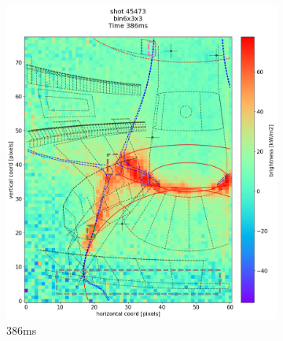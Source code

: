 \begin{figure}
     \centering
     \begin{subfigure}{0.355\linewidth}
         \centering
         \includegraphics[trim={50 0 25 80},clip,width=\textwidth]{Chapters/chapter2/figs/IRVB-MASTU_shot-45473_export_34.png}
         \caption{386ms}
         \label{fig:45473_export_1}
     \end{subfigure}
     \begin{subfigure}{0.355\linewidth}
         \centering

\end{subfigure}
\end{figure}
